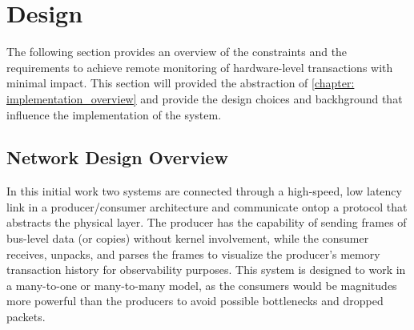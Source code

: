 \chapter{Design}
\label{chapter:design}
\thispagestyle{myheadings}
The following section provides an overview of the constraints and the requirements to achieve remote monitoring of hardware-level transactions with minimal impact. This section will provided the abstraction of \ref*{chapter: implementation_overview} and provide the design choices and backhground that influence the implementation of the system.


\section{Network Design Overview}

In this initial work two systems are connected through a high-speed, low latency link in a producer/consumer architecture and communicate ontop a protocol that abstracts the physical layer. The producer has the capability of sending frames of bus-level data (or copies) without kernel involvement, while the consumer receives, unpacks, and parses the frames to visualize the producer's memory transaction history for observability purposes. 
This system is designed to work in a many-to-one or many-to-many model, as the consumers would be magnitudes more powerful than the producers to avoid possible bottlenecks and dropped packets.
